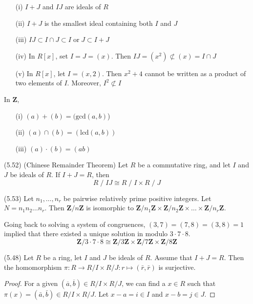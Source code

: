 \vspace{2ex}
\begin{rmk}
\begin{itemize}
\item[(i)] $I+J$ and $IJ$ are ideals of $R$
\item[(ii)] $I+J$ is the smallest ideal containing both $I$ and $J$
\item[(iii)] $IJ\subset I\cap J\subset I\;\mathrm{or}\;J\subset I+J$
\item[(iv)] In $R[x]$, set $I=J=(x)$. Then $IJ=(x^2)\not\subset  (x)=I\cap J$
\item[(v)] In $R[x]$, let $I=(x,2)$. Then $x^2+4$ cannot be written as a product of two elements of $I$. Moreover, $I^2\not\subset I$
\end{itemize}
\end{rmk}
\vspace{2ex}
\begin{ex}
In ${\bm Z}$, 
\begin{itemize}
\item[(i)] $(a)+(b)=(\mathrm{gcd}(a,b)$)
\item[(ii)] $(a)\cap (b)=(\mathrm{lcd}(a,b))$
\item[(iii)] $(a)\cdot (b)=(ab)$
\end{itemize}
\end{ex}
\vspace{2ex}
\begin{thm}
(5.52) (Chinese Remainder Theorem) Let $R$ be a commutative ring, and let $I$ and $J$ be ideals of $R$. If $I+J=R$, then
\[R\;/\;IJ\cong R\;/\;I\times R\;/\;J\]
\end{thm}
\vspace{2ex}
\begin{cor}
(5.53) Let $n_1,\ldots ,n_{r}$ be pairwise relatively prime positive integers. Let $N=n_1n_2\ldots n_{r}$. Then ${\bm Z}/n{\bm Z}$ is isomorphic to ${\bm Z}/n_1{\bm Z}\times {\bm Z}/n_2{\bm Z}\times \ldots \times {\bm Z}/n_{r}{\bm Z}$. 
\end{cor}
\vspace{2ex}
\begin{rmk}
Going back to solving a system of congruences, $(3,7)=(7,8)=(3,8)=1$ implied that there existed a unique solution in modulo $3\cdot  7\cdot 8$. 
\[{\bm Z}/3\cdot 7\cdot 8\cong {\bm Z}/3{\bm Z}\times {\bm Z}/7{\bm Z}\times {\bm Z}/8{\bm Z}\]
\end{rmk}
\vspace{2ex}
\begin{prop}
(5.48) Let $R$ be a ring, let $I$ and $J$ be ideals of $R$. Assume that $I+J=R$. Then the homomorphism $\pi :R\rightarrow R/I\times R/J:r\mapsto (\bar{r},\bar{r})$ is surjective. 
\end{prop}
\vspace{2ex}
\begin{proof}
For a given $(\overline{a},\overline{b})\in R/I\times R/J$, we can find a $x\in R$ such that $\pi (x)=(\bar{a},\bar{b})\in R/I\times R/J$. Let $x-a=i\in I$ and $x-b=j\in J$. 
\end{proof}
\vspace{2ex}

